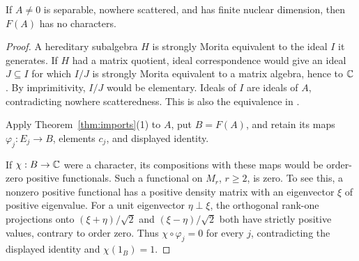 \begin{lemma}\label{lem:nocharacters}
If \(A\ne0\) is separable, nowhere scattered, and has finite nuclear dimension, then \(F(A)\) has no characters.
\end{lemma}
\begin{proof}
A hereditary subalgebra \(H\) is strongly Morita equivalent to the ideal \(I\) it generates. If \(H\) had a matrix quotient, ideal correspondence would give an ideal \(J\subseteq I\) for which \(I/J\) is strongly Morita equivalent to a matrix algebra, hence to \(\mathbb C\). By imprimitivity, \(I/J\) would be elementary. Ideals of \(I\) are ideals of \(A\), contradicting nowhere scatteredness. This is also the equivalence in \cite[Theorem 3.1]{TV}.

Apply Theorem~\ref{thm:imports}(1) to $A$, put $B=F(A)$, and retain its
maps $\varphi_j:E_j\to B$, elements $c_j$, and displayed identity.

If \(\chi:B\to\mathbb C\) were a character, its compositions with these maps would be order-zero positive functionals. Such a functional on \(M_r\), \(r\geq2\), is zero. To see this, a nonzero positive functional has a positive density matrix with an eigenvector \(\xi\) of positive eigenvalue. For a unit eigenvector \(\eta\perp\xi\), the orthogonal rank-one projections onto \((\xi+\eta)/\sqrt2\) and \((\xi-\eta)/\sqrt2\) both have strictly positive values, contrary to order zero. Thus \(\chi\circ\varphi_j=0\) for every \(j\), contradicting the displayed identity and \(\chi(1_B)=1\).
\end{proof}

